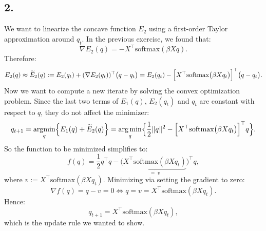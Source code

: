 \documentclass[12pt,a4paper]{article}
\begin{document}
    \subsection{2.}
        We want to linearize the concave function \(E_{2}\) using a first-order Taylor approximation around \(q_t\). In the previous exercise, we found that:
        \[
            \nabla E_{2}(q)
            = -X^\top \mathrm{softmax}(\beta X q).
        \]
        Therefore:
        \[
            E_2(q) \approx \widetilde E_2(q) := E_2(q_t) + (\nabla E_2(q_t))^\top \bigl( q - q_t \bigr)
            = E_2(q_t) - \Bigl[ X^\top \mathrm{softmax} \bigl( \beta X q_t \bigr) \Bigr]^\top \bigl( q - q_t \bigr).
        \]
        Now we want to compute a new iterate by solving the convex optimization problem. Since the last two terms of  \(E_1(q)\), \(E_2(q_t)\) and \(q_t\) are constant with respect to \(q\), they do not affect the minimizer:
        \[
            q_{t+1}  = \underset{q}{\mathrm{argmin}} \Bigl\{ E_1(q) + \widetilde E_2(q) \Bigr\}
            = \underset{q}{\mathrm{arg\,min}} \Bigl\{ \frac{1}{2} \|q\|^2 - \Bigl[ X^\top \mathrm{softmax} \bigl( \beta X q_t \bigr) \Bigr]^\top q \Bigr\}.
        \]
        So the function to be minimized simplifies to:
        \[
            f(q) = \frac{1}{2} q^\top q - \bigl(\underbrace{X^\top \mathrm{softmax} (\beta X q_t)}_{=\;v})^{\!\top}q,
        \]
        where \(v := X^\top \mathrm{softmax}(\beta X q_t)\).
        Minimizing via setting the gradient to zero:
        \[
        \nabla f(q) = q - v = 0 \Leftrightarrow q = v = X^\top \mathrm{softmax}(\beta X q_t).
        \]
        Hence:
        \[
            q_{t+1} = X^\top \mathrm{softmax}(\beta X q_t),
        \]
        which is the update rule we wanted to show.

    \newpage
\end{document}
